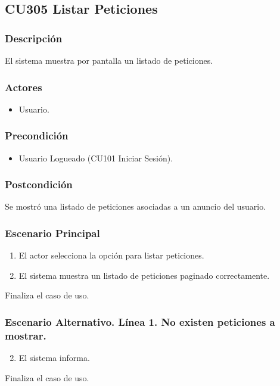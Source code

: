 \subsection{CU305 Listar Peticiones}
\subsubsection{Descripci\'{o}n}
El sistema muestra por pantalla un listado de peticiones.
\subsubsection{Actores}
\begin{itemize}
\item Usuario.
\end{itemize}
\subsubsection{Precondici\'{o}n}
\begin{itemize}
\item Usuario Logueado (CU101 Iniciar Sesi\'{o}n).
\end{itemize}
\subsubsection{Postcondici\'{o}n}
Se mostr\'{o} una listado de peticiones asociadas a un anuncio del usuario.
\subsubsection{Escenario Principal}
\begin{enumerate}
\item El actor selecciona la opci\'{o}n para listar peticiones.
\item El sistema muestra un listado de peticiones paginado correctamente.
\end{enumerate}
Finaliza el caso de uso.
\subsubsection{Escenario Alternativo. L\'{i}nea 1. No existen peticiones a mostrar.}
\begin{enumerate}
\setcounter{enumi}{1}
\item El sistema informa.
\end{enumerate}
Finaliza el caso de uso.